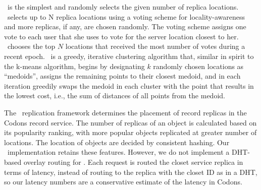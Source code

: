 {{\uniform\ is the simplest and randomly selects the given number of replica locations. \auspice\ selects up to N  replica locations using a voting scheme for locality-awareness and more replicas, if any, are chosen randomly. The voting scheme assigns one vote to each user that she uses to vote for the server location closest to her.  \auspice\ chooses the top $N$ locations that received the most number of votes during a recent epoch. \kmedoids\ is a greedy, iterative clustering algorithm \cite{kmedoids} that, similar in spirit to the k-means algorithm, begins by designating $k$ randomly chosen locations as ``medoids'', assigns the remaining points to their closest medoid, and in each iteration greedily swaps the medoid in each cluster with the point that results in the lowest cost, i.e., the sum of distances of all points from the medoid.


The \beehive\ replication framework determines the placement of record replicas in the Codons record service. 
The number of replicas of an object is calculated based on its popularity ranking, with more popular objects replicated at greater number of  locations. 
The location of objects are decided by consistent hashing.
Our \beehive\ implementation retains these features.
However, we do not implement a DHT-based overlay routing for \beehive.
Each request is routed the closet service replica in terms of latency,  instead of routing to the replica with the closet ID as in a DHT, so our latency numbers are a conservative estimate of the latency in Codons.


}
}




